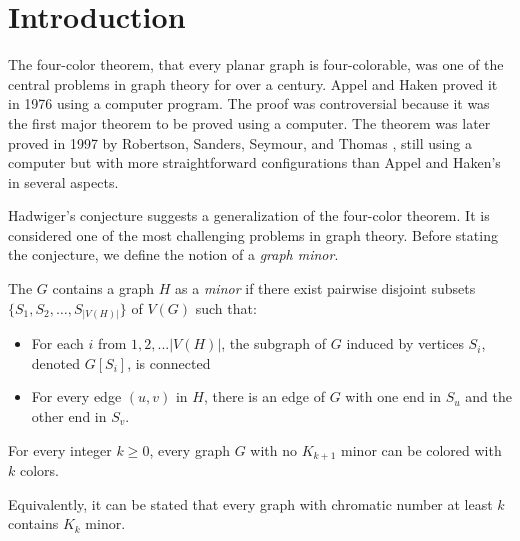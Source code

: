 \chapter{Introduction}

The four-color theorem, that every planar graph is four-colorable, was one of the central problems
in graph theory for over a century. Appel and Haken proved it in 1976 \cite{appel_haken_1977} using a computer program.
The proof was controversial because it was the first major theorem to be proved using a computer.
The theorem was later proved in 1997 by Robertson, Sanders, Seymour, and Thomas \cite{ROBERTSON19972},
still using a computer but with more straightforward configurations than Appel and Haken's in several aspects. 

Hadwiger's conjecture \cite{hadwiger_1943} suggests a generalization of the four-color theorem. It is considered one of 
the most challenging problems in graph theory. Before stating the conjecture, we define the notion of a \textit{graph minor}.

\begin{defn}[Minor]
    The $G$ contains a graph $H$ as a \textit{minor} if there exist pairwise disjoint subsets $\{S_1, S_2, \dots, S_{|V(H)|}\}$ of $V(G)$
    such that:
       \begin{itemize}
           \item For each $i$ from $1, 2, ... |V(H)|$, the subgraph of $G$ induced by vertices $S_i$, denoted $G[S_i]$, is connected
           \item For every edge $(u,v)$ in $H$, there is an edge of $G$ with one end in $S_u$ and the other end in $S_v$.
       \end{itemize} 
\end{defn}

\begin{conj} 
 For every integer $k \geq 0$, every graph $G$ with no $K_{k+1}$ minor can be colored with $k$ colors.
\end{conj}

Equivalently, it can be stated that every graph with chromatic number at least $k$ contains $K_k$ minor.

